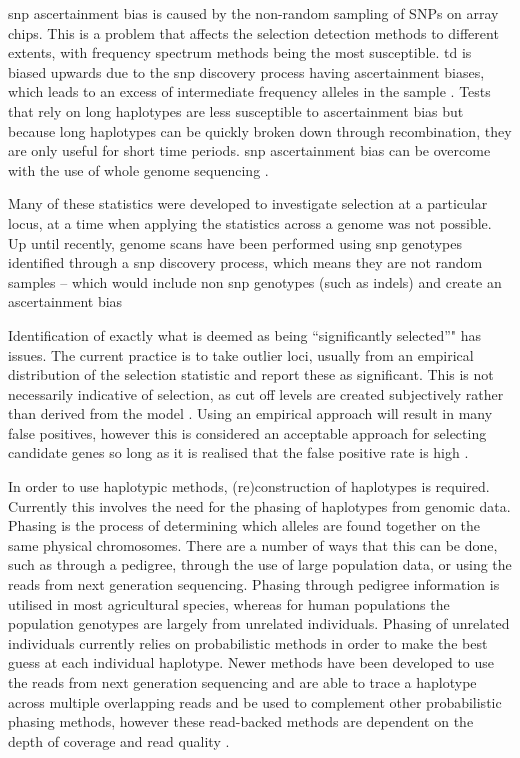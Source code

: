 \documentclass[]{report}
\begin{document}
\Gls{snp} ascertainment bias is caused by the non-random sampling of
SNPs on array chips. This is a problem that affects the selection
detection methods to different extents, with frequency spectrum methods
being the most susceptible. \Gls{td} is biased upwards due to the
\gls{snp} discovery process having ascertainment biases, which leads to
an excess of intermediate frequency alleles in the sample
\citep{Kelley2006}. Tests that rely on long haplotypes are less
susceptible to ascertainment bias \citep{sabeti2006positive} but because
long haplotypes can be quickly broken down through recombination, they
are only useful for short time periods. \Gls{snp} ascertainment bias can
be overcome with the use of whole genome sequencing
\citep{Albrechtsen2010}.

Many of these statistics were developed to investigate selection at a
particular locus, at a time when applying the statistics across a genome
was not possible. Up until recently, genome scans have been performed
using \gls{snp} genotypes identified through a \gls{snp} discovery
process, which means they are not random samples -- which would include
non \gls{snp} genotypes (such as \glspl{indel}) and create an
ascertainment bias \citep{Nielsen2005a}

Identification of exactly what is deemed as being ``significantly
selected''" has issues. The current practice is to take outlier loci,
usually from an empirical distribution of the selection statistic and
report these as significant. This is not necessarily indicative of
selection, as cut off levels are created subjectively rather than
derived from the model \citep{Qanbari2012a}. Using an empirical approach
will result in many false positives, however this is considered an
acceptable approach for selecting candidate genes so long as it is
realised that the false positive rate is high \citep{Kelley2006}.

In order to use haplotypic methods, (re)construction of haplotypes is
required. Currently this involves the need for the phasing of haplotypes
from genomic data. Phasing is the process of determining which alleles
are found together on the same physical chromosomes. There are a number
of ways that this can be done, such as through a pedigree, through the
use of large population data, or using the reads from next generation
sequencing. Phasing through pedigree information is utilised in most
agricultural species, whereas for human populations the population
genotypes are largely from unrelated individuals. Phasing of unrelated
individuals currently relies on probabilistic methods
\citep{Browning2009, Delaneau2012, Delaneau2013} in order to make the
best guess at each individual haplotype. Newer methods have been
developed to use the reads from next generation sequencing and are able
to trace a haplotype across multiple overlapping reads and be used to
complement other probabilistic phasing methods, however these
read-backed methods are dependent on the depth of coverage and read
quality \citep{Delaneau2014}.
\end{document}
